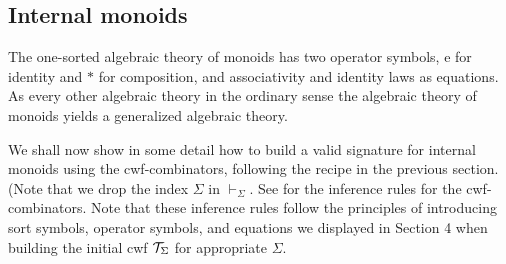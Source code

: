 \documentclass{lmcs}
\def\idmon{\mathrm{e}}
\def\comp{\mathrm{*}}
\begin{document}
\subsection{Internal monoids} The one-sorted algebraic theory of monoids has two operator symbols,
$\idmon$ for identity and $\comp$ for composition, and associativity and identity laws as equations.
As every other algebraic theory in the ordinary sense the algebraic theory of monoids yields a
generalized algebraic theory. 


We shall now show in some detail how to build a valid signature for internal monoids 
using the cwf-combinators, following the recipe in the previous section. 
(Note that we drop the index $\Sigma$ in $\vdash_\Sigma$. See \cite{CCD} for
the inference rules for the cwf-combinators. 
Note that these inference rules follow the principles of introducing sort symbols, operator symbols, and equations we displayed in Section 4 when building the initial cwf ${\mathcal T}_\Sigma$ for appropriate $\Sigma$.
\end{document}
